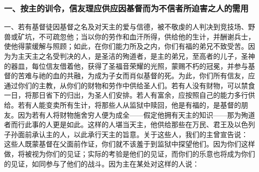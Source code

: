 
\subsubsection{一、按主的训令，信友理应供应因基督而为不信者所迫害之人的需用}

一、若有基督徒因基督之名及对天主的爱与信德，被不敬虔的人判决到竞技场、野兽或矿坑，不可疏忽他；当以你的劳作和血汗所得，供给他的生计，并酬谢兵士，使他得蒙缓解与照顾；如此，在你们能力所及之内，你们有福的弟兄不致受苦。因为为主天主之名受判决的人，是圣洁的殉道者，是主的弟兄，至高者的儿子，圣神的器皿，每位信友借着他，获得了圣福音荣耀的光照，蒙赐不朽的冠冕，并参与基督的苦难与祂的血的共融，为成为子女而肖似基督的死。为此，你们所有信友，应通过你们的主教，从你们的财物和劳作中供给圣人们。若有人没有财物，可以禁食一日，将那日省下的归出，为圣人们安排。若人有富余，应按照自己的能力多行供给。若有人能变卖所有生计，将那些人从监狱中赎回，他是有福的，是基督的朋友。因为若有人将财物施舍穷人便为成全——假定他拥有天主的知识——那为殉道者而行此事的人更是如此。这样的人堪当天主，他供给那些在万民、君王及以色列子孙面前承认主的人，以此承行天主的旨意。关于这些人，我们的主曾宣告说： 这些人既蒙基督在父面前作证，你们就不该羞于到监狱中探望他们。因为你们这样做，将被视为你们的见证；实际的考验是他们的见证，而你们的乐意也将成为你们的见证，如同参与了他们的战斗。因为主在某处对这样的人说：\par


